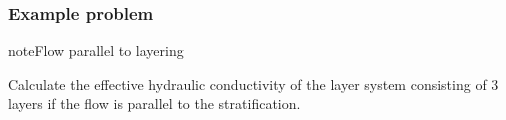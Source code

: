 \documentclass[letterpaper,10pt,english]{sphinxmanual}
\begin{document}
\subsubsection{Example problem}
\label{\detokenize{contents/flow/lecture_05/15_het_iso:example-problem}}
\begin{sphinxadmonition}{note}{Flow parallel to layering}

Calculate the effective hydraulic conductivity of the layer system consisting of 3 layers if the flow is parallel to the stratification.
\end{sphinxadmonition}

\begin{sphinxVerbatim}[commandchars=\\\{\}]
   

\PYG{l+s+s2}{[1m Provided are: }\PYG{l+s+s2}{[0m }

   
  
  

  
  
  


  


\end{sphinxVerbatim}
\end{document}
